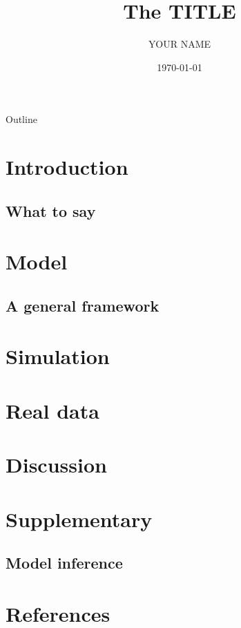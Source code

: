 \documentclass{beamer}
\title[abbr]{The TITLE}
\author{YOUR NAME}
\date{\today}
\begin{document}
\begin{frame}
  \titlepage
\end{frame}

\begin{frame}{Outline}
  \tableofcontents[hideallsubsections]
\end{frame}

\section{Introduction}
\subsection*{What to say}
\section{Model}
\subsection{A general framework}
\section{Simulation}
\section{Real data}
\section{Discussion}
\section*{Supplementary}
\subsection*{Model inference} 
\section{References}
\begin{frame}[allowframebreaks]
  
\end{frame}
\end{document}
